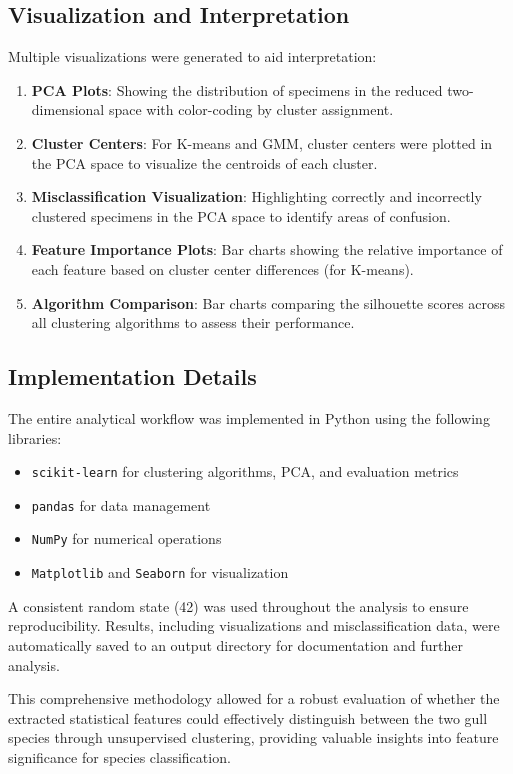 \documentclass[a4paper,12pt]{report}
\begin{document}
\subsection{Visualization and Interpretation}
Multiple visualizations were generated to aid interpretation:
\begin{enumerate}
    \item \textbf{PCA Plots}: Showing the distribution of specimens in the reduced two-dimensional space with color-coding by cluster assignment.
    \item \textbf{Cluster Centers}: For K-means and GMM, cluster centers were plotted in the PCA space to visualize the centroids of each cluster.
    \item \textbf{Misclassification Visualization}: Highlighting correctly and incorrectly clustered specimens in the PCA space to identify areas of confusion.
    \item \textbf{Feature Importance Plots}: Bar charts showing the relative importance of each feature based on cluster center differences (for K-means).
    \item \textbf{Algorithm Comparison}: Bar charts comparing the silhouette scores across all clustering algorithms to assess their performance.
\end{enumerate}

\subsection{Implementation Details}

The entire analytical workflow was implemented in Python using the following libraries:

\begin{itemize}
    \item \texttt{scikit-learn} for clustering algorithms, PCA, and evaluation metrics
    \item \texttt{pandas} for data management
    \item \texttt{NumPy} for numerical operations
    \item \texttt{Matplotlib} and \texttt{Seaborn} for visualization
\end{itemize}
A consistent random state (42) was used throughout the analysis to ensure reproducibility. Results, including visualizations and misclassification data, were automatically saved to an output directory for documentation and further analysis.

This comprehensive methodology allowed for a robust evaluation of whether the extracted statistical features could effectively distinguish between the two gull species through unsupervised clustering, providing valuable insights into feature significance for species classification.
\end{document}
